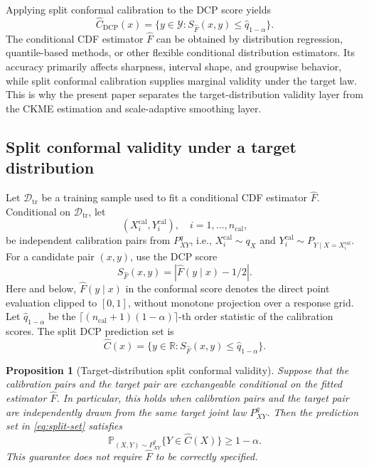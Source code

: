 \documentclass[11pt]{article}
\newtheorem{proposition}{Proposition}
\newcommand{\Ycal}{\mathcal Y}
\newcommand{\Dcal}{\mathcal D}
\newcommand{\Pp}{\mathbb P}
\newcommand{\R}{\mathbb R}
\newcommand{\abs}[1]{\left\lvert #1 \right\rvert}
\begin{document}
Applying split conformal calibration to the DCP score yields
\[
  \widehat C_{\mathrm{DCP}}(x)
  =
  \{y\in\Ycal:S_{\widehat F}(x,y)\le \widehat q_{1-\alpha}\}.
\]
The conditional CDF estimator \(\widehat F\) can be obtained by distribution regression, quantile-based methods, or other flexible conditional distribution estimators. Its accuracy primarily affects sharpness, interval shape, and groupwise behavior, while split conformal calibration supplies marginal validity under the target law. This is why the present paper separates the target-distribution validity layer from the CKME estimation and scale-adaptive smoothing layer.

\subsection{Split conformal validity under a target distribution}

Let \(\Dcal_{\mathrm{tr}}\) be a training sample used to fit a conditional CDF estimator \(\widehat F\). Conditional on \(\Dcal_{\mathrm{tr}}\), let
\[
  (X_i^{\mathrm{cal}},Y_i^{\mathrm{cal}}),\quad i=1,\ldots,n_{\mathrm{cal}},
\]
be independent calibration pairs from \(P^q_{XY}\), i.e., \(X_i^{\mathrm{cal}}\sim q_X\) and \(Y_i^{\mathrm{cal}}\sim P_{Y\mid X=X_i^{\mathrm{cal}}}\). For a candidate pair \((x,y)\), use the DCP score
\begin{equation}
  S_{\widehat F}(x,y)=\abs{\widehat F(y\mid x)-1/2}.
  \label{eq:dcp-score}
\end{equation}
Here and below, \(\widehat F(y\mid x)\) in the conformal score denotes the direct point evaluation clipped to \([0,1]\), without monotone projection over a response grid.
Let \(\widehat q_{1-\alpha}\) be the \(\lceil(n_{\mathrm{cal}}+1)(1-\alpha)\rceil\)-th order statistic of the calibration scores. The split DCP prediction set is
\begin{equation}
  \widehat C(x)=\{y\in\R:S_{\widehat F}(x,y)\le \widehat q_{1-\alpha}\}.
  \label{eq:split-set}
\end{equation}

\begin{proposition}[Target-distribution split conformal validity]
\label{prop:target-validity}
Suppose that the calibration pairs and the target pair are exchangeable conditional on the fitted estimator \(\widehat F\). In particular, this holds when calibration pairs and the target pair are independently drawn from the same target joint law \(P^q_{XY}\). Then the prediction set in \eqref{eq:split-set} satisfies
\[
  \Pp_{(X,Y)\sim P^q_{XY}}\{Y\in \widehat C(X)\}\ge 1-\alpha .
\]
This guarantee does not require \(\widehat F\) to be correctly specified.
\end{proposition}
\end{document}
